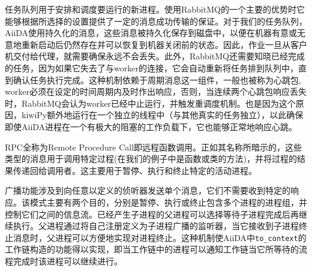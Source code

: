 任务队列用于安排和调度要运行的新进程。使用RabbitMQ的一个主要的优势时它能够根据所选择的设置提供了一定的消息成功传输的保证。对于我们的任务队列，AiiDA使用持久化的消息，这些消息被持久化保存到磁盘中，以便在机器有意或无意地重新启动后仍然存在并可以恢复到机器关闭前的状态。因此，作业一旦从客户机交付给代理，就需要确保永远不会丢失。此外，RabbitMQ还需要知晓已经完成的任务，因为如果它失去了与worker的连接，它会自动重新将任务排到队列中，直到确认任务执行完成。这种机制依赖于周期消息这一组件，一般也被称为心跳包, worker必须在设定的时间周期内及时作出响应，否则，当连续两个心跳包响应丢失时，RabbitMQ会认为worker已经中止运行，并触发重调度机制。也是因为这个原因，kiwiPy额外地运行在一个独立的线程中（与其他真实的任务独立），以此确保即使AiiDA进程在一个有极大的阻塞的工作负载下，它也能够正常地响应心跳。

RPC全称为Remote Procedure Call即远程函数调用。正如其名称所暗示的，这些类型的消息用于调用特定过程(在我们的例子中是函数或类的方法)，并将过程的结果传递回给调用者。这主要用于暂停、执行和终止特定的活动进程。

广播功能涉及到向任意以定义的侦听器发送单个消息，它们不需要收到特定的响应。该模式主要有两个目的，分别是暂停、执行或终止包含多个进程的进程组，并控制它们之间的信息流。已经产生子进程的父进程可以选择等待子进程完成后再继续执行。父进程通过将自己注册定义为子进程广播的监听器，当它接收到子进程终止消息时，父进程可以方便地实现对进程终止。这种机制使AiiDA中\texttt{to\_context}的工作链构造的功能得以实现，即当工作链中的进程可以通知工作链当它所等待的流程完成时该进程可以继续进行。
